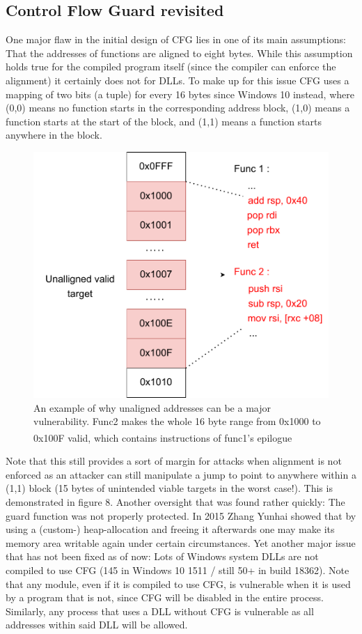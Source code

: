 \documentclass[10pt,twocolumn,a4paper]{article}
\begin{document}
\subsection{Control Flow Guard revisited}
One major flaw in the initial design of CFG lies in one of its main assumptions: That the addresses of functions are aligned to eight bytes.
While this assumption holds true for the compiled program itself (since the compiler can enforce the alignment) it certainly does not for DLLs.
To make up for this issue CFG uses a mapping of two bits (a tuple) for every 16 bytes since Windows 10 instead, where (0,0) means no function starts in the corresponding address block, (1,0) means a function starts at the start of the block, and (1,1) means a function starts anywhere in the block\cite{tuple}.
\begin{figure}[h]
	\includegraphics[keepaspectratio,width=\linewidth]{fig/unallignedcode}
	\caption{An example of why unaligned addresses can be a major vulnerability. Func2 makes the whole 16 byte range from 0x1000 to 0x100F valid, which contains instructions of func1's epilogue\textsuperscript{\cite{cfgexplore}}}
\end{figure}\newline
Note that this still provides a sort of margin for attacks when alignment is not enforced as an attacker can still manipulate a jump to point to anywhere within a (1,1) block (15 bytes of unintended viable targets in the worst case!).
This is demonstrated in figure 8.
Another oversight that was found rather quickly: The guard function was not properly protected.
In 2015 Zhang Yunhai showed that by using a (custom-) heap-allocation and freeing it afterwards one may make its memory area writable again under certain circumstances\cite{cfgbypass}.
Yet another major issue that has not been fixed as of now:
Lots of Windows system DLLs are not compiled to use CFG (145 in Windows 10 1511 / still 50+ in build 18362\cite{cfgbypass2}).
Note that any module, even if it is compiled to use CFG, is vulnerable when it is used by a program that is not, since CFG will be disabled in the entire process\cite{cfgexplore}.
Similarly, any process that uses a DLL without CFG is vulnerable as all addresses within said DLL will be allowed\cite{cfgbypass2}.
\end{document}
